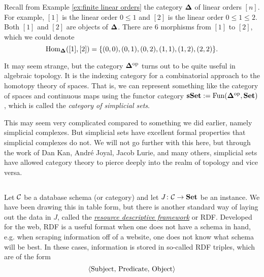 \begin{example}\label{ex:simplicial set}

Recall from Example \ref{ex:finite linear orders} the category ${\bf \Delta}$ of linear orders $[n]$. For example, $[1]$ is the linear order $0\leq 1$ and $[2]$ is the linear order $0\leq 1\leq2$. Both $[1]$ and $[2]$ are objects of ${\bf \Delta}$. There are 6 morphisms from $[1]$ to $[2]$, which we could denote $$\textnormal{Hom}_{{\bf \Delta}}([1],[2])=\{(0,0), (0,1), (0,2), (1,1), (1,2), (2,2)\}.$$

It may seem strange, but the category ${\bf \Delta}^\textnormal{op}$ turns out to be quite useful in algebraic topology. It is the indexing category for a combinatorial approach to the homotopy theory of spaces. That is, we can represent something like the category of spaces and continuous maps using the functor category ${\bf sSet}:=\textnormal{Fun}({\bf \Delta}^\textnormal{op},{\bf Set})$, which is called the {\em category of simplicial sets}. 

This may seem very complicated compared to something we did earlier, namely simplicial complexes. But simplicial sets have excellent formal properties that simplicial complexes do not. We will not go further with this here, but through the work of Dan Kan, Andr\'{e} Joyal, Jacob Lurie, and many others, simplicial sets have allowed category theory to pierce deeply into the realm of topology and vice versa.

\end{example}


\subsection{}\label{sec:grothendieck construction}

Let $\mathcal{C}$ be a database schema (or category) and let $J\colon\mathcal{C}\rightarrow{\bf Set}$ be an instance. We have been drawing this in table form, but there is another standard way of laying out the data in $J$, called the \href{http://en.wikipedia.org/wiki/Resource_Description_Framework}{\em resource descriptive framework} or RDF. Developed for the web, RDF is a useful format when one does not have a schema in hand, e.g. when scraping information off of a website, one does not know what schema will be best. In these cases, information is stored in so-called RDF triples, which are of the form $$\langle\textnormal{Subject, Predicate, Object}\rangle$$

